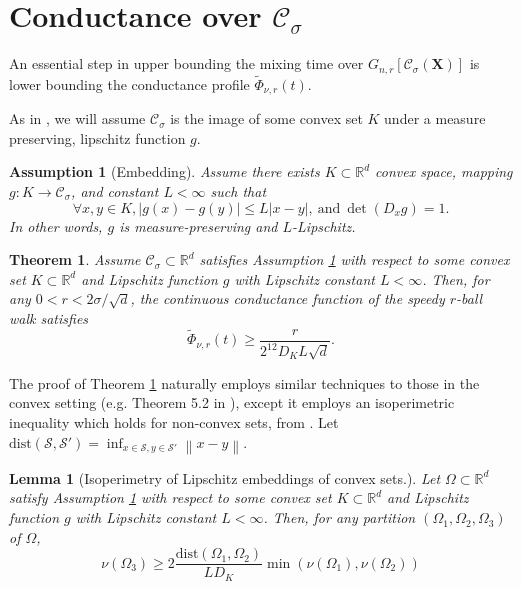 \documentclass{article}
\newcommand{\Reals}{\mathbb{R}}
\newcommand{\norm}[1]{\left\lVert#1\right\rVert}
\newcommand{\abs}[1]{\left \lvert #1 \right \rvert}
\newcommand{\dist}{\mathrm{dist}}
\newcommand{\Rd}{\Reals^d}
\newcommand{\Xbf}{\mathbf{X}}
\newcommand{\Cset}{\mathcal{C}}
\newcommand{\Sset}{\mathcal{S}}
\newcommand{\Csig}{\Cset_{\sigma}}
\newcommand{\1}{\mathbf{1}}
\theoremstyle{alden}
\theoremstyle{aldenthm}
\newtheorem{theorem}{Theorem}
\newtheorem{lemma}{Lemma}
\newtheorem{assumption}{Assumption}
\theoremstyle{remark}
\begin{document}
\section{Conductance over $\Csig$}
An essential step in upper bounding the mixing time over $G_{n,r}[\Csig(\Xbf)]$ is lower bounding the conductance profile $\widetilde{\Phi}_{\nu,r}(t)$. 

As in \citep{abbasi-yadkori2016}, we will assume $\Csig$ is the image of some convex set $K$ under a measure preserving, lipschitz function $g$.

\begin{assumption}[Embedding]
	\label{asmp: embedding}
	 Assume there exists $K \subset \Rd$ convex space, mapping $g: K \to \Csig$, and constant $L < \infty$ such that
	\begin{equation*}
	\forall x,y \in K,  \abs{g(x) - g(y)} \leq L \abs{x - y},~\text{and}~ \det(D_x g) = 1.
	\end{equation*}
	In other words, $g$ is measure-preserving and $L$-Lipschitz.
\end{assumption}

\begin{theorem}
	\label{thm: continuous_conductance_function}
	Assume $\Csig \subset \Rd$ satisfies Assumption \ref{asmp: embedding} with respect to some convex set $K \subset \Rd$ and Lipschitz function $g$ with Lipschitz constant $L <  \infty$. Then, for any $0 < r < 2 \sigma / \sqrt{d}$, the continuous conductance function of the speedy $r$-ball walk satisfies
	\begin{equation*}
	\widetilde{\Phi}_{\nu,r}(t) \geq \frac{r}{2^{12} D_K L \sqrt{d}}.
	\end{equation*}
\end{theorem}
The proof of Theorem \ref{thm: continuous_conductance_function} naturally employs similar techniques to those in the convex setting (e.g. Theorem 5.2 in \cite{vempala2005}), except it employs an isoperimetric inequality which holds for non-convex sets, from \cite{abbasi-yadkori2016a}. Let $\dist(\Sset, \Sset') = \inf_{x \in \Sset, y \in \Sset'} \norm{x - y}$. 

\begin{lemma}[Isoperimetry of Lipschitz embeddings of convex sets.]
	\label{lem: nonconvex_isoperimetry}
	Let $\Omega \subset \Rd$ satisfy Assumption \ref{asmp: embedding} with respect to some convex set $K \subset \Rd$ and Lipschitz function $g$ with Lipschitz constant $L <  \infty$. Then, for any partition $(\Omega_1,\Omega_2,\Omega_3)$ of $\Omega$, 
	\begin{equation*}
	\nu(\Omega_3) \geq 2\frac{\dist(\Omega_1, \Omega_2)}{L D_{K}} \min(\nu(\Omega_1), \nu(\Omega_2))
	\end{equation*}
\end{lemma}
\end{document}
